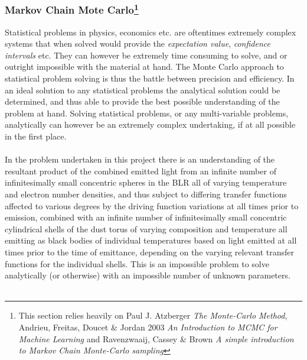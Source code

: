 \documentclass[a4paper, 12pt, twoside]{article}
\begin{document}
\subsubsection[Markov Chain Mote Carlo]{Markov Chain Mote Carlo\footnote{This section relies heavily on Paul J. Atzberger \emph{The Monte-Carlo Method}, Andrieu, Freitas, Doucet \& Jordan 2003 \emph{An Introduction to MCMC for Machine Learning} and Ravenzwaaij, Cassey \& Brown \emph{A simple introduction to Markov Chain Monte-Carlo sampling}}}
Statistical problems in physics, economics etc. are oftentimes extremely complex systems that when solved would provide the \emph{expectation value}, \emph{confidence intervals} etc. They can however be extremely time consuming to solve, and or outright impossible with the material at hand. The Monte Carlo approach to statistical problem solving is thus the battle between precision and efficiency. In an ideal solution to any statistical problems the analytical solution could be determined, and thus able to provide the best possible understanding of the problem at hand. Solving statistical problems, or any multi-variable problems, analytically can however be an extremely complex undertaking, if at all possible in the first place. \\
\\
In the problem undertaken in this project there is an understanding of the resultant product of the combined emitted light from an infinite number of infinitesimally small concentric spheres in the BLR all of varying temperature and electron number densities, and thus subject to differing transfer functions affected to various degrees by the driving function variations at all times prior to emission, combined with an infinite number of infinitesimally small concentric cylindrical shells of the dust torus of varying composition and temperature all emitting as black bodies of individual temperatures based on light emitted at all times prior to the time of emittance, depending on the varying relevant transfer functions for the individual shells. This is an impossible problem to solve analytically (or otherwise) with an impossible number of unknown parameters. \\
\\
\end{document}
